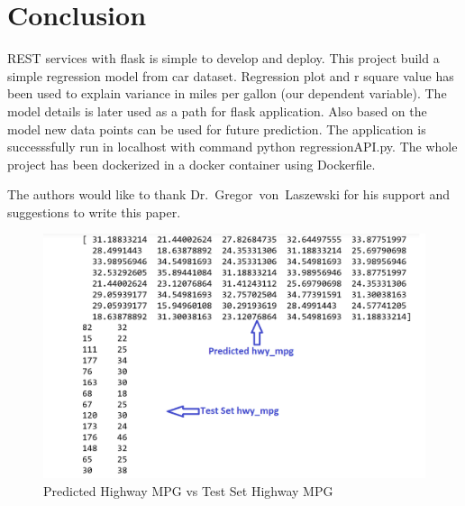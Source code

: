 \section{Conclusion}

REST services with flask is simple to develop and deploy. 
This project build a
simple regression model from car dataset. Regression plot and r square
value has been used to explain variance in miles per gallon (our dependent
variable). The model details is later used as 
a path for flask application. Also based on the model new data points can be 
used for future prediction. The application is successsfully run in localhost
with command python regressionAPI.py. The whole project has been dockerized in
a docker container using Dockerfile. 




\begin{acks}

  The authors would like to thank Dr.~Gregor~von~Laszewski for his
  support and suggestions to write this paper.

\end{acks}

\begin{figure}[htb]
\includegraphics[width=1.0\columnwidth]{images/testset_pred_hwy_mpg.png}
  \caption{Predicted Highway MPG vs Test Set Highway MPG}
  \label{p:HwyMpg Compare}
\end{figure}




